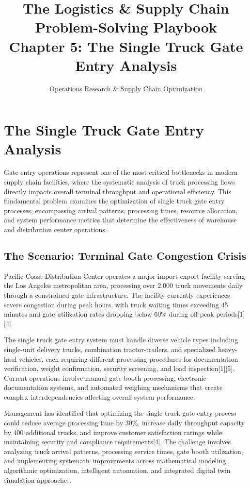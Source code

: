 \documentclass{article}
\title{The Logistics \& Supply Chain Problem-Solving Playbook\\Chapter 5: The Single Truck Gate Entry Analysis}
\author{Operations Research \& Supply Chain Optimization}
\date{}
\begin{document}
\maketitle

\section{The Single Truck Gate Entry Analysis}

Gate entry operations represent one of the most critical bottlenecks in modern supply chain facilities, where the systematic analysis of truck processing flows directly impacts overall terminal throughput and operational efficiency. This fundamental problem examines the optimization of single truck gate entry processes, encompassing arrival patterns, processing times, resource allocation, and system performance metrics that determine the effectiveness of warehouse and distribution center operations.

\subsection{The Scenario: Terminal Gate Congestion Crisis}

Pacific Coast Distribution Center operates a major import-export facility serving the Los Angeles metropolitan area, processing over 2,000 truck movements daily through a constrained gate infrastructure. The facility currently experiences severe congestion during peak hours, with truck waiting times exceeding 45 minutes and gate utilization rates dropping below 60\% during off-peak periods[1][4]. 

The single truck gate entry system must handle diverse vehicle types including single-unit delivery trucks, combination tractor-trailers, and specialized heavy-haul vehicles, each requiring different processing procedures for documentation verification, weight confirmation, security screening, and load inspection[1][5]. Current operations involve manual gate booth processing, electronic documentation systems, and automated weighing mechanisms that create complex interdependencies affecting overall system performance.

Management has identified that optimizing the single truck gate entry process could reduce average processing time by 30\%, increase daily throughput capacity by 400 additional trucks, and improve customer satisfaction ratings while maintaining security and compliance requirements[4]. The challenge involves analyzing truck arrival patterns, processing service times, gate booth utilization, and implementing systematic improvements across mathematical modeling, algorithmic optimization, intelligent automation, and integrated digital twin simulation approaches.
\end{document}
